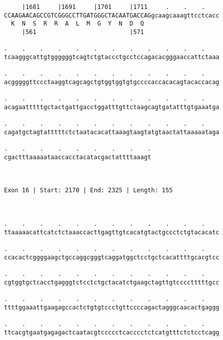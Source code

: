 \documentclass{article}
\begin{document}
\begin{Verbatim}
     |1681     |1691     |1701     |1711     .    .    .    
CCAAGAACAGCCGTCGGGCCTTGATGGGCTACAATGACCAGgcaagcaaagttcctcacc
  K  N  S  R  R  A  L  M  G  Y  N  D  Q                     
     |561                          |571                     
  
.    .    .    .    .    .    .    .    .    .    .    .    
tcaagggcattgtggggggtcagtctgtaccctgcctccagacacgggaaccattctaaa
                                                            
.    .    .    .    .    .    .    .    .    .    .    .    
acgggggttccctaaggtcagcagctgtggtggtgtgccccaccacacagtacaccacag
                                                            
.    .    .    .    .    .    .    .    .    .    .    .    
acagaatttttgctactgattgacctggatttgttctaagcagtgatatttgtgaaatga
                                                            
.    .    .    .    .    .    .    .    .    .    .    .    
cagatgctagtatttttctctaatacacattaaagtaagtatgtaactattaaaaataga
                                                            
.    .    .    .    .    .    .    .    .
cgactttaaaaataaccacctacatacgactattttaaagt
                                         
                                         
 
Exon 16 | Start: 2170 | End: 2325 | Length: 155



.    .    .    .    .    .    .    .    .    .    .    .    
ttaaaaacattcatctctaaaccacttgagttgtcacatgtactgccctctgtacacatc
                                                            
.    .    .    .    .    .    .    .    .    .    .    .    
ccacactcggggaagctgccaggcgggtcaggatggctcctgctcacattttgcacgtcc
                                                            
.    .    .    .    .    .    .    .    .    .    .    .    
cgtggtgctcacctgagggtctcctctgctacatctgaagctagttgtcccctttttgcc
                                                            
.    .    .    .    .    .    .    .    .    .    .    .    
ttttggaaattgaagagccactctgtgtccctgttccccagactagggcaacactgaggg
                                                            
.    .    .    .    .    .    .    .    .    .    .    .    
ttcacgtgaatgagagactcaatacgtccccctcacccctctcatgtttctctcctcagg
                                                            

\end{Verbatim}
\end{document}
